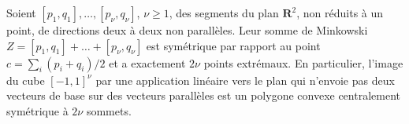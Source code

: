 \begin{encadre}
\begin{theoreme*}
Soient $[p_1, q_1], \dots, [p_\nu, q_\nu]$, $\nu \geq 1$, des segments du plan $\mathbf R^2$, non réduits à un point, de directions deux à deux non parallèles. Leur somme de Minkowski $Z = [p_1, q_1] + \dots + [p_\nu, q_\nu]$ est symétrique par rapport au point $c = \sum_i (p_i + q_i)/2$ et a exactement $2\nu$ points extrémaux. En particulier, l'image du cube $[-1, 1]^\nu$ par une application linéaire vers le plan qui n'envoie pas deux vecteurs de base sur des vecteurs parallèles est un polygone convexe centralement symétrique à $2\nu$ sommets.
\end{theoreme*}
\end{encadre}

